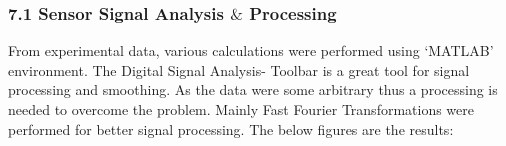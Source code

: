 
\vspace{\baselineskip}
\subsubsection*{7.1 Sensor Signal Analysis $\&$  Processing}
\begin{justify}
From experimental data, various calculations were performed using ‘MATLAB’ environment. The Digital Signal Analysis- Toolbar is a great tool for signal processing and smoothing. As the data were some arbitrary thus a processing is needed to overcome the problem. Mainly Fast Fourier Transformations were performed for better signal processing. The below figures are the results:
\end{justify}\par

